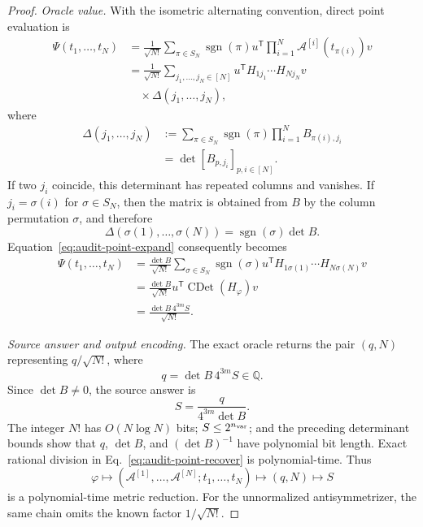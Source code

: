 \documentclass[aps,pra,reprint,superscriptaddress,nofootinbib,longbibliography,showkeys]{revtex4-2}
\theoremstyle{definition}
\newcommand{\CDet}{\operatorname{CDet}}
\begin{document}
\begin{proof}
\medskip\noindent\textit{Oracle value.}\quad
With the isometric alternating convention, direct point evaluation is
\begin{align}
\Psi(t_1,\ldots,t_N)
&=\frac{1}{\sqrt{N!}}
\sum_{\pi\in S_N}\operatorname{sgn}(\pi)
u^{\mathsf T}\prod_{i=1}^{N}\mathcal A^{[i]}(t_{\pi(i)})v\nonumber\\
&=\frac{1}{\sqrt{N!}}
\sum_{j_1,\ldots,j_N\in[N]}
u^{\mathsf T}H_{1j_1}\cdots H_{Nj_N}v\nonumber\\
&\quad\times\Delta(j_1,\ldots,j_N),
\label{eq:audit-point-expand}
\end{align}
where
\begin{align}
\Delta(j_1,\ldots,j_N)
&:=\sum_{\pi\in S_N}\operatorname{sgn}(\pi)
\prod_{i=1}^{N}B_{\pi(i),j_i}\nonumber\\
&=\det[B_{p,j_i}]_{p,i\in[N]}.
\end{align}
If two $j_i$ coincide, this determinant has repeated columns and vanishes.  If
$j_i=\sigma(i)$ for $\sigma\in S_N$, then the matrix is obtained from $B$ by
the column permutation $\sigma$, and therefore
\begin{equation}
\Delta(\sigma(1),\ldots,\sigma(N))
=\operatorname{sgn}(\sigma)\det B.
\end{equation}
Equation~\eqref{eq:audit-point-expand} consequently becomes
\begin{align}
\Psi(t_1,\ldots,t_N)
&=\frac{\det B}{\sqrt{N!}}
\sum_{\sigma\in S_N}\operatorname{sgn}(\sigma)
u^{\mathsf T}H_{1\sigma(1)}\cdots H_{N\sigma(N)}v\nonumber\\
&=\frac{\det B}{\sqrt{N!}}
u^{\mathsf T}\CDet(H_\varphi)v\nonumber\\
&=\frac{\det B\,4^{3m}S}{\sqrt{N!}}.
\label{eq:legendre-point-value}
\end{align}

\medskip\noindent\textit{Source answer and output encoding.}\quad
The exact oracle returns the pair $(q,N)$ representing
$q/\sqrt{N!}$, where
\begin{equation}
q=\det B\,4^{3m}S\in\mathbb Q.
\end{equation}
Since $\det B\ne0$, the source answer is
\begin{equation}
S=\frac{q}{4^{3m}\det B}.
\label{eq:audit-point-recover}
\end{equation}
The integer $N!$ has $O(N\log N)$ bits; $S\le2^{n_{\rm var}}$; and the
preceding determinant bounds show that $q$, $\det B$, and $(\det B)^{-1}$ have
polynomial bit length.  Exact rational division in
Eq.~\eqref{eq:audit-point-recover} is polynomial-time.  Thus
\begin{equation}
\varphi\longmapsto
(\mathcal A^{[1]},\ldots,\mathcal A^{[N]};t_1,\ldots,t_N)
\longmapsto(q,N)\longmapsto S
\end{equation}
is a polynomial-time metric reduction.  For the unnormalized antisymmetrizer,
the same chain omits the known factor $1/\sqrt{N!}$.
\end{proof}
\end{document}
